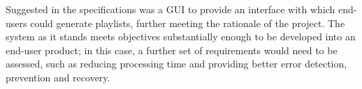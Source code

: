 Suggested in the specifications was a GUI to provide an interface with which end-users could generate playlists, further meeting the rationale of the project. The system as it stands meets objectives substantially enough to be developed into an end-user product; in this case, a further set of requirements would need to be assessed, such as reducing processing time and providing better error detection, prevention and recovery.
